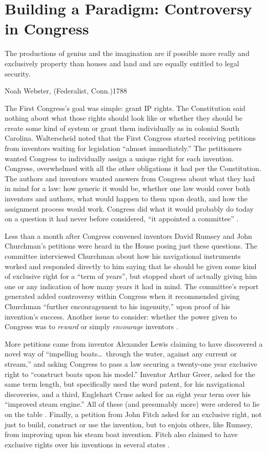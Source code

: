 \documentclass[12pt,letterpaper]{article}
\begin{document}
{\section{Building a Paradigm: Controversy in Congress}
\epigraph{The productions of genius and the imagination are if possible more really and exclusively property than houses and land and are equally entitled to legal security.}{Noah Webster, (Federalist, Conn.)1788}

The First Congress's goal was simple: grant IP rights. The Constitution said nothing about what those rights should look like or whether they should be create some kind of system or grant them individually as in colonial South Carolina. Walterscheid noted that the First Congress started receiving petitions from inventors waiting for legislation ``almost immediately.'' The petitioners wanted Congress to individually assign a unique right for each invention. Congress, overwhelmed with all the other obligations it had per the Constitution. The authors and inventors wanted answers from Congress about what they had in mind for a law: how generic it would be, whether one law would cover both inventors and authors, what would happen to them upon death, and how the assignment process would work. Congress did what it would probably do today on a question it had never before considered, ``it appointed a committee'' \autocite[458]{Walterscheid1997}. 

Less than a month after Congress convened inventors David Rumsey and John Churchman's petitions were heard in the House posing  just these questions. The committee interviewed Churchman about how his navigational instruments worked and responded directly to him saying that he should be given some kind of exclusive right for a ``term of years'', but stopped short of actually giving him one or any indication of how many years it had in mind. The committee's report generated added controversy within Congress when it recommended giving Churchman ``further encouragement to his ingenuity,'' upon proof of his invention's success. Another issue to consider: whether the power given to Congress was to \emph{reward} or simply \emph{encourage} inventors \autocite[456-459]{Walterscheid1997}.

More petitions came from inventor Alexander Lewis claiming to have discovered a novel way of ``impelling boats\ldots~through the water, against any current or stream,'' and asking Congress to pass a law securing a twenty-one year exclusive right to ``construct boats upon his model.'' Inventor Arthur Greer, asked for the same term length, but specifically used the word patent, for his navigational discoveries, and a third, Englehart Cruse asked for an eight year term over his ``improved steam engine.'' All of these (and presumably more) were ordered to lie on the table \autocite[459]{Walterscheid1997}. Finally, a petition from John Fitch asked for an exclusive right, not just to build, construct or use the invention, but to enjoin others, like Rumsey, from improving upon his steam boat invention. Fitch also claimed to have exclusive rights over his inventions in several states \autocite[460-462]{Walterscheid1997}. 

}
\end{document}
